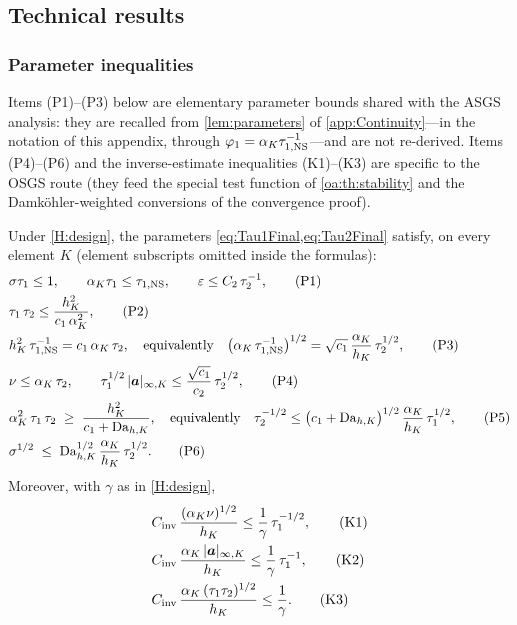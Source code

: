 \subsection{Technical results}
\label{oa:sec:technical}

\subsubsection{Parameter inequalities}

Items (P1)--(P3) below are elementary parameter bounds shared with the ASGS analysis: they are
recalled from \cref{lem:parameters} of \cref{app:Continuity}---in the notation of this appendix,
through $\varphi_1=\alpha_K\tau_{1,\mathrm{NS}}^{-1}$---and are not re-derived. Items (P4)--(P6) and the
inverse{\hyp}estimate inequalities (K1)--(K3) are specific to the OSGS route (they feed the
special test function of \cref{oa:th:stability} and the Damk\"ohler-weighted conversions of the
convergence proof).

\begin{lemma}
\label{oa:lem:parameters}
Under \cref{H:design}, the parameters \cref{eq:Tau1Final,eq:Tau2Final} satisfy, on every element $K$
(element subscripts omitted inside the formulas):
\begin{align}
  &\sigma\tau_1 \le 1,
  \qquad
  \alpha_K \tau_1 \le \tau_{1,\mathrm{NS}},
  \qquad
  \varepsilon \le C_2\, \tau_2^{-1},
  \tag{P1}\label{oa:eq:P1}\\
  &\tau_1\,\tau_2 \le \frac{h_K^2}{c_1\,\alpha_K^2},
  \tag{P2}\label{oa:eq:P2}\\
  &h_K^2\,\tau_{1,\mathrm{NS}}^{-1} = c_1\,\alpha_K\,\tau_2,
  \quad\text{equivalently}\quad
  \bigl(\alpha_K\,\tau_{1,\mathrm{NS}}^{-1}\bigr)^{1/2} = \sqrt{c_1}\,\frac{\alpha_K}{h_K}\,\tau_2^{1/2},
  \tag{P3}\label{oa:eq:P3}\\
  &\nu \le \alpha_K\,\tau_2,
  \qquad
  \tau_1^{1/2}\,|\boldsymbol{a}|_{\infty,K} \le \frac{\sqrt{c_1}}{c_2}\,\tau_2^{1/2},
  \tag{P4}\label{oa:eq:P4}\\
  &\alpha_K^2\,\tau_1\,\tau_2 \;\ge\; \frac{h_K^2}{c_1 + \mathrm{Da}_{h,K}},
  \quad\text{equivalently}\quad
  \tau_2^{-1/2} \le \bigl(c_1 + \mathrm{Da}_{h,K}\bigr)^{1/2}\,\frac{\alpha_K}{h_K}\,\tau_1^{1/2},
  \tag{P5}\label{oa:eq:P5}\\
  &\sigma^{1/2} \;\le\; \mathrm{Da}_{h,K}^{1/2}\,\frac{\alpha_K}{h_K}\,\tau_2^{1/2}.
  \tag{P6}\label{oa:eq:P6}
\end{align}
Moreover, with $\gamma$ as in \cref{H:design},
\begin{align}
  &C_{\mathrm{inv}}\,\frac{(\alpha_K\nu)^{1/2}}{h_K} \le \frac{1}{\gamma}\,\tau_1^{-1/2},
  \tag{K1}\label{oa:eq:K1}\\
  &C_{\mathrm{inv}}\,\frac{\alpha_K\,|\boldsymbol{a}|_{\infty,K}}{h_K} \le \frac{1}{\gamma}\,\tau_1^{-1},
  \tag{K2}\label{oa:eq:K2}\\
  &C_{\mathrm{inv}}\,\frac{\alpha_K\,(\tau_1\tau_2)^{1/2}}{h_K} \le \frac{1}{\gamma}.
  \tag{K3}\label{oa:eq:K3}
\end{align}
\end{lemma}

